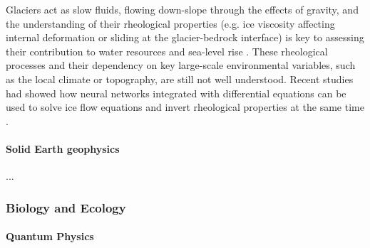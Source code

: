 Glaciers act as slow fluids, flowing down-slope through the effects of gravity, and the understanding of their rheological properties (e.g. ice viscosity affecting internal deformation or sliding at the glacier-bedrock interface) is key to assessing their contribution to water resources and sea-level rise \cite{cuffey_physics_2010}. 
These rheological processes and their dependency on key large-scale environmental variables, such as the local climate or topography, are still not well understood.
Recent studies had showed how neural networks integrated with differential equations can be used to solve ice flow equations\cite{Jouvet_Cordonnier_Kim_Lüthi_Vieli_Aschwanden_2021, Jouvet_2022} and invert rheological properties at the same time \cite{bolibar_universal_2023, wang2022discovering}.  

\paragraph{Solid Earth geophysics}
...

\subsubsection{Biology and Ecology}


\paragraph{Quantum Physics}

